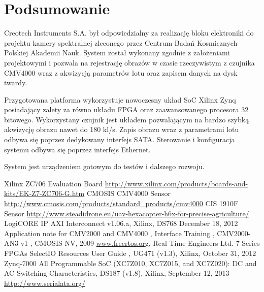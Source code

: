 \documentclass[a4paper,11pt,oneside]{report}  %
\begin{document}


\chapter{Podsumowanie}
Creotech Instruments S.A. był odpowiedzialny za realizację bloku elektroniki do projektu kamery spektralnej zleconego przez Centrum Badań Kosmicznych Polskiej Akademii Nauk. System został wykonany zgodnie z założeniami projektowymi i pozwala na rejestrację obrazów w czasie rzeczywistym z czujnika CMV4000 wraz z akwizycją parametrów lotu oraz zapisem danych na dysk twardy. 

Przygotowana platforma wykorzystuje nowoczesny układ SoC Xilinx Zynq posiadający zalety za równo układu FPGA oraz zaawansowanego procesora 32 bitowego. Wykorzystany czujnik jest układem pozwalającym na bardzo szybką akwizycję obrazu nawet do 180 kl/s. Zapis obrazu wraz z parametrami lotu odbywa się poprzez dedykowany interfejs SATA. Sterowanie i konfiguracja systemu odbywa się poprzez interfejs Ethernet.

System jest urządzeniem gotowym do testów i dalszego rozwoju. 









\begin{thebibliography}{9}
 Xilinx ZC706 Evaluation Board \url{http://www.xilinx.com/products/boards-and-kits/EK-Z7-ZC706-G.htm}
 CMOSIS CMV4000 Sensor \url{http://www.cmosis.com/products/standard\_products/cmv4000}
 CIS 1910F Sensor
 \url{http://www.steadidrone.eu/uav-hexacopter-h6x-for-precise-agriculture/}
  LogiCORE IP AXI Interconnect v1.06.a, Xilinx, DS768 December 18, 2012
 Application note for CMV2000 and CMV4000 , Interface Training , CMV2000-AN3-v1 , CMOSIS NV, 2009
  \url{www.freertos.org}, Real Time Engineers Ltd.
 7 Series FPGAs SelectIO Resources User Guide , UG471 (v1.3), Xilinx, October 31, 2012
 Zynq-7000 All Programmable SoC (XC7Z010, XC7Z015, and XC7Z020): DC and AC Switching Characteristics, DS187 (v1.8), Xilinx, September 12, 2013
\cite{SATA} \url{http://www.serialata.org/}

\end{thebibliography}
\end{document}
